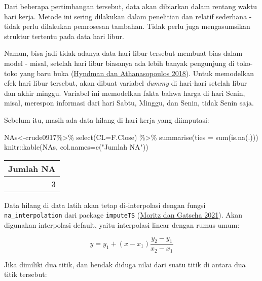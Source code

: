 \documentclass[
]{book}
\newenvironment{Shaded}{\begin{snugshade}}{\end{snugshade}}
\newcommand{\AttributeTok}[1]{\textcolor[rgb]{0.77,0.63,0.00}{#1}}
\newcommand{\FunctionTok}[1]{\textcolor[rgb]{0.00,0.00,0.00}{#1}}
\newcommand{\NormalTok}[1]{#1}
\newcommand{\OtherTok}[1]{\textcolor[rgb]{0.56,0.35,0.01}{#1}}
\newcommand{\SpecialCharTok}[1]{\textcolor[rgb]{0.00,0.00,0.00}{#1}}
\newcommand{\StringTok}[1]{\textcolor[rgb]{0.31,0.60,0.02}{#1}}
\begin{document}
Dari beberapa pertimbangan tersebut, data akan dibiarkan dalam rentang waktu hari kerja. Metode ini sering dilakukan dalam penelitian dan relatif sederhana - tidak perlu dilakukan pemrosesan tambahan. Tidak perlu juga mengasumsikan struktur tertentu pada data hari libur.

Namun, bisa jadi tidak adanya data hari libur tersebut membuat bias dalam model - misal, setelah hari libur biasanya ada lebih banyak pengunjung di toko-toko yang baru buka (\protect\hyperlink{ref-fpp2}{Hyndman dan Athanasopoulos 2018}). Untuk memodelkan efek hari libur tersebut, akan dibuat variabel \emph{dummy} di hari-hari setelah libur dan akhir minggu. Variabel ini memodelkan fakta bahwa harga di hari Senin, misal, merespon informasi dari hari Sabtu, Minggu, dan Senin, tidak Senin saja.

Sebelum itu, masih ada data hilang di hari kerja yang diimputasi:

\begin{Shaded}
\begin{Highlighting}[]
\NormalTok{NAs}\OtherTok{\textless{}{-}}\NormalTok{crude0917}\SpecialCharTok{\%\textgreater{}\%} \FunctionTok{select}\NormalTok{(}\StringTok{\textasciigrave{}}\AttributeTok{CL=F.Close}\StringTok{\textasciigrave{}}\NormalTok{) }\SpecialCharTok{\%\textgreater{}\%} \FunctionTok{summarise}\NormalTok{(}\AttributeTok{ties =} \FunctionTok{sum}\NormalTok{(}\FunctionTok{is.na}\NormalTok{(.)))}
\NormalTok{knitr}\SpecialCharTok{::}\FunctionTok{kable}\NormalTok{(NAs,}
             \AttributeTok{col.names=}\FunctionTok{c}\NormalTok{(}\StringTok{"Jumlah NA"}\NormalTok{))}
\end{Highlighting}
\end{Shaded}

\begin{tabular}{r}
\hline
Jumlah NA\\
\hline
3\\
\hline
\end{tabular}

Data hilang di data latih akan tetap di-interpolasi dengan fungsi \texttt{na\_interpolation} dari package \texttt{imputeTS} (\protect\hyperlink{ref-R-imputeTS}{Moritz dan Gatscha 2021}). Akan digunakan interpolasi default, yaitu interpolasi linear dengan rumus umum:

\[
y=y_{1}+(x-x_1)\frac{y_{2}-y_{1}}{x_{2}-x_{1}}
\]

Jika dimiliki dua titik, dan hendak diduga nilai dari suatu titik di antara dua titik tersebut:
\end{document}
